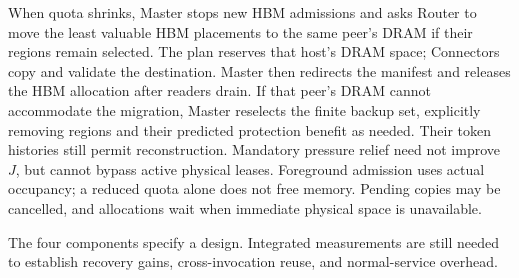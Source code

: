 When quota shrinks, Master stops new HBM admissions and asks Router
to move the least valuable HBM placements to the same peer's DRAM if
their regions remain selected. The plan reserves that host's DRAM
space; Connectors copy and validate the destination. Master then
redirects the manifest and releases the HBM allocation after readers
drain. If that peer's DRAM cannot accommodate the migration, Master
reselects the finite backup set, explicitly removing regions and their
predicted protection benefit as needed.
Their token histories still permit reconstruction. Mandatory pressure
relief need not improve $J$, but cannot bypass active physical leases.
Foreground admission uses actual occupancy; a reduced quota alone
does not free memory. Pending copies may be cancelled, and allocations
wait when immediate physical space is unavailable.

The four components specify a design. Integrated measurements are
still needed to establish recovery gains, cross-invocation reuse, and
normal-service overhead.
